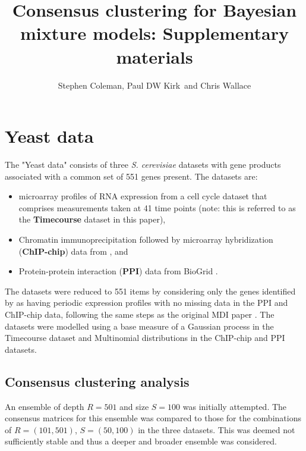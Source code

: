 \documentclass[]{article}
\title{Consensus clustering for Bayesian mixture models: Supplementary materials}
\author{Stephen Coleman, Paul DW Kirk\, and Chris Wallace}
\begin{document}
\maketitle

\begin{abstract}

\end{abstract}

\section{Yeast data}

The "Yeast data" consists of three \emph{S. cerevisiae} datasets with gene products associated with a common set of 551 genes present. The datasets are:
\begin{itemize}
	\item microarray profiles of RNA expression from \cite{granovskaia2010high} a cell cycle dataset that comprises measurements taken at 41 time points (note: this is referred to as the \textbf{Timecourse} dataset in this paper),
	\item Chromatin immunoprecipitation followed by microarray hybridization (\textbf{ChIP-chip}) data from \cite{harbison2004transcriptional}, and
	\item Protein-protein interaction (\textbf{PPI}) data from BioGrid \citep{stark2006biogrid}.
\end{itemize}
The datasets were reduced to 551 items by considering only the genes identified by \cite{granovskaia2010high} as having periodic expression profiles with no missing data in the PPI and ChIP-chip data, following the same steps as the original MDI paper \citep{kirk2012bayesian}. The datasets were modelled using a base measure of a Gaussian process in the Timecourse dataset and Multinomial distributions in the ChIP-chip and PPI datasets.

\subsection{Consensus clustering analysis}
An ensemble of depth $R=501$ and size $S=100$ was initially attempted. The consensus matrices for this ensemble was compared to those for the combinations of $R = (101, 501)$, $S=(50, 100)$ in the three datasets. This was deemed not sufficiently stable and thus a deeper and broader ensemble was considered.
\end{document}
